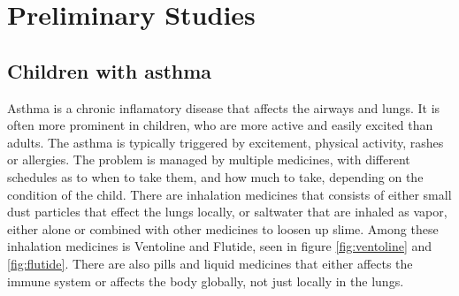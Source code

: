 \chapter{Preliminary Studies}
\label{chap:prestudy}
\section{Children with asthma}
Asthma is a chronic inflamatory disease that affects the airways and lungs.\cite{naafastma} It is often more prominent in children, who are more 
active and easily excited than adults. The asthma is typically triggered by excitement, physical activity, rashes or allergies. The problem is 
managed by multiple medicines, 
with different schedules as to when to take them, and how much to take, depending on the condition of the child. There are inhalation medicines that 
consists of either small dust particles that effect the lungs locally, or saltwater that are inhaled as vapor, either alone or combined with other 
medicines to loosen up slime. Among these inhalation medicines is Ventoline and Flutide, seen in figure \ref{fig:ventoline} and \ref{fig:flutide}. 
There are also pills and liquid medicines that either affects the immune system or affects the body globally, not just locally in the lungs.

